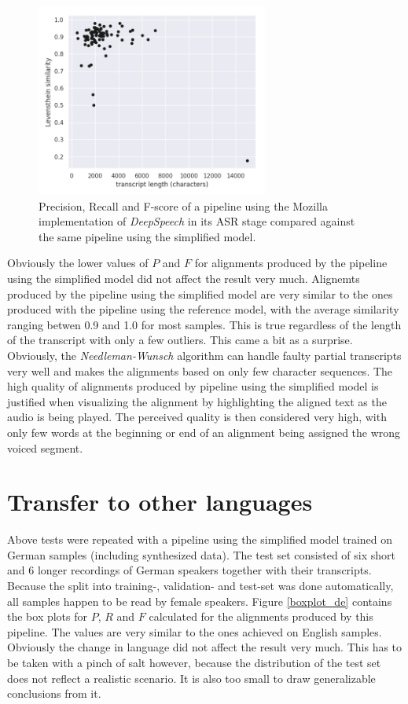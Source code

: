 \documentclass[letterpaper]{article}
\begin{document}
\begin{figure}[!htb]
	\begin{center}
		\includegraphics[width=3in]{scatterplot_en.png}
		\caption{Precision, Recall and F-score of a pipeline using the Mozilla implementation of \textit{DeepSpeech} in its ASR stage compared against the same pipeline using the simplified model.}
		\label{scatterplot_en}
	\end{center}
\end{figure}

Obviously the lower values of $P$ and $F$ for alignments produced by the pipeline using the simplified model did not affect the result very much. Alignemts produced by the pipeline using the simplified model are very similar to the ones produced with the pipeline using the reference model, with the average similarity ranging betwen 0.9 and 1.0 for most samples. This is true regardless of the length of the transcript with only a few outliers. This came a bit as a surprise. Obviously, the \textit{Needleman-Wunsch} algorithm can handle faulty partial transcripts very well and makes the alignments based on only few character sequences. The high quality of alignments produced by pipeline using the simplified model is justified when visualizing the alignment by highlighting the aligned text as the audio is being played. The perceived quality is then considered very high, with only few words at the beginning or end of an alignment being assigned the wrong voiced segment.

\section{Transfer to other languages}

Above tests were repeated with a pipeline using the simplified model trained on German samples (including synthesized data). The test set consisted of six short and 6 longer recordings of German speakers together with their transcripts. Because the split into training-, validation- and test-set was done automatically, all samples happen to be read by female speakers. Figure \ref{boxplot_de} contains the box plots for $P$, $R$ and $F$ calculated for the alignments produced by this pipeline. The values are very similar to the ones achieved on English samples. Obviously the change in language did not affect the result very much. This has to be taken with a pinch of salt however, because the distribution of the test set does not reflect a realistic scenario. It is also too small to draw generalizable conclusions from it.
\end{document}
